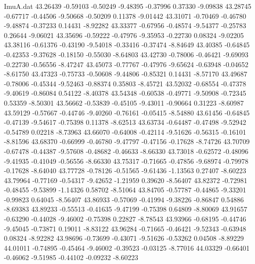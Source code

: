 \begin{filecontents}{ImuA.dat}
  43.26439   -0.59103   -0.50249   -9.48395   -0.37996    0.37330   -9.09838
  43.28745   -0.67717   -0.44506   -9.50668   -0.50209    0.11378   -9.01442
  43.31071   -0.70469   -0.46780   -9.48874   -0.37233    0.14431   -8.92282
  43.33377   -0.67956   -0.48574   -9.54377   -0.25783    0.26644   -9.06021
  43.35696   -0.59222   -0.47976   -9.35953   -0.22730    0.08324   -9.02205
  43.38116   -0.61376   -0.43190   -9.54018   -0.33416   -0.37474   -8.84649
  43.40385   -0.64845   -0.42353   -9.37628   -0.18150   -0.55030   -8.64803
  43.42730   -0.78006   -0.46421   -9.69093   -0.22730   -0.56556   -8.47247
  43.45073   -0.77767   -0.47976   -9.65624   -0.63948   -0.04652   -8.61750
  43.47323   -0.75733   -0.50608   -9.44806   -0.85321    0.14431   -8.57170
  43.49687   -0.78006   -0.45344   -9.52463   -0.88374    0.35803   -8.45721
  43.52032   -0.68554   -0.47378   -9.40619   -0.86084    0.54122   -8.40378
  43.54348   -0.60538   -0.49771   -9.50908   -0.72345    0.53359   -8.50301
  43.56662   -0.53839   -0.45105   -9.43011   -0.90664    0.31223   -8.60987
  43.59129   -0.57667   -0.44746   -9.40260   -0.76161   -0.05415   -8.54880
  43.61456   -0.64845   -0.47139   -9.54617   -0.75398    0.11378   -8.62513
  43.63734   -0.64487   -0.47498   -9.52942   -0.54789    0.02218   -8.73963
  43.66070   -0.64008   -0.42114   -9.51626   -0.56315   -0.16101   -8.81596
  43.68370   -0.66999   -0.46780   -9.47797   -0.47156   -0.17628   -8.74726
  43.70709   -0.67478   -0.44387   -9.57608   -0.48682   -0.46633   -8.66330
  43.73018   -0.62572   -0.48096   -9.41935   -0.41049   -0.56556   -8.66330
  43.75317   -0.71665   -0.47856   -9.68974   -0.79978   -0.17628   -8.64040
  43.77728   -0.78126   -0.51565   -9.61436   -1.13563    0.27407   -8.60223
  43.79964   -0.77169   -0.54317   -9.42652   -1.21959    0.39620   -8.56407
  43.82372   -0.72981   -0.48455   -9.53899   -1.14326    0.58702   -8.51064
  43.84705   -0.57787   -0.44865   -9.33201   -0.99823    0.64045   -8.56407
  43.86933   -0.57069   -0.41994   -9.38226   -0.86847    0.54886   -8.69383
  43.89233   -0.55513   -0.41635   -9.47199   -0.75398    0.64809   -8.80069
  43.91657   -0.63290   -0.44028   -9.46002   -0.75398    0.22827   -8.78543
  43.93966   -0.68195   -0.44746   -9.45045   -0.73871    0.19011   -8.83122
  43.96284   -0.71665   -0.46421   -9.52343   -0.63948    0.08324   -8.92282
  43.98696   -0.73699   -0.43071   -9.51626   -0.53262    0.04508   -8.89229
  44.01011   -0.74895   -0.45464   -9.46002   -0.39523   -0.03125   -8.77016
  44.03329   -0.66401   -0.46062   -9.51985   -0.44102   -0.09232   -8.60223

\end{filecontents}
